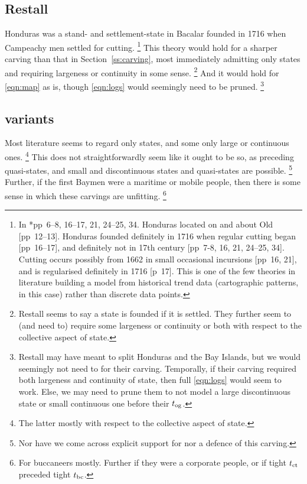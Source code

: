 	\subsection{Restall}
	\label{ss:restall}
		Honduras was a stand- and settlement-state in Bacalar founded in 1716 when Campeachy men settled for cutting.%
		\footnote{In \cite{res19}*{pp~6--8, 16--17, 21, 24--25, 34}. Honduras located on and about Old [pp~12--13]. Honduras founded definitely in 1716 when regular cutting began [pp~16--17], and definitely not in 17th century [pp~7-8, 16, 21, 24--25, 34]. Cutting occurs possibly from 1662 in small occasional incursions [pp~16, 21], and is regularised definitely in 1716 [p~17]. This is one of the few theories in literature building a model from historical trend data (cartographic patterns, in this case) rather than discrete data points.} %
		This theory would hold for a sharper carving than that in Section~\ref{ss:carving}, most immediately admitting only states and requiring largeness or continuity in some sense.%
		\footnote{Restall seems to say a state is founded if it is settled. They further seem to (and need to) require some largeness or continuity or both with respect to the collective aspect of state.}
		And it would hold for \ref{eqn:map} as is, though \ref{eqn:logs} would seemingly need to be pruned.%
		\footnote{Restall may have meant to split Honduras and the Bay Islands, but we would seemingly not need to for their carving. Temporally, if their carving required both largeness and continuity of state, then full \ref{eqn:logs} would seem to work. Else, we may need to prune them to not model a large discontinuous state or small continuous one before their \(t_{\operatorname{og}}\).} %
	\subsection{ variants}
	\label{ss:possypolities}
		Most literature seems to regard only states, and some only large or continuous ones.%
		\footnote{The latter mostly with respect to the collective aspect of state.} %
		This does not straightforwardly seem like it ought to be so, as preceding quasi-states, and small and discontinuous states and quasi-states are possible.%
		\footnote{Nor have we come across explicit support for nor a defence of this carving.}
		Further, if the first Baymen were a maritime or mobile people, then there is some sense in which these carvings are unfitting.%
		\footnote{For buccaneers mostly. Further if they were a corporate people, or if tight \(t_{\operatorname{ct}}\) preceded tight \(t_{\operatorname{bc}}\).}
